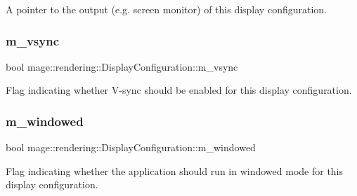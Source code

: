 A pointer to the output (e.\+g. screen monitor) of this display configuration. \hypertarget{classmage_1_1rendering_1_1_display_configuration_a749335db324a29c8b4ac30acf1c5361d}{}\label{classmage_1_1rendering_1_1_display_configuration_a749335db324a29c8b4ac30acf1c5361d} 
\subsubsection{\texorpdfstring{m\+\_\+vsync}{m\_vsync}}
{\footnotesize\ttfamily bool mage\+::rendering\+::\+Display\+Configuration\+::m\+\_\+vsync\hspace{0.3cm}{\ttfamily [private]}}

Flag indicating whether V-\/sync should be enabled for this display configuration. \hypertarget{classmage_1_1rendering_1_1_display_configuration_a9d2117628e8b8f6a9b6548a9c0b11c36}{}\label{classmage_1_1rendering_1_1_display_configuration_a9d2117628e8b8f6a9b6548a9c0b11c36} 
\subsubsection{\texorpdfstring{m\+\_\+windowed}{m\_windowed}}
{\footnotesize\ttfamily bool mage\+::rendering\+::\+Display\+Configuration\+::m\+\_\+windowed\hspace{0.3cm}{\ttfamily [private]}}

Flag indicating whether the application should run in windowed mode for this display configuration. 